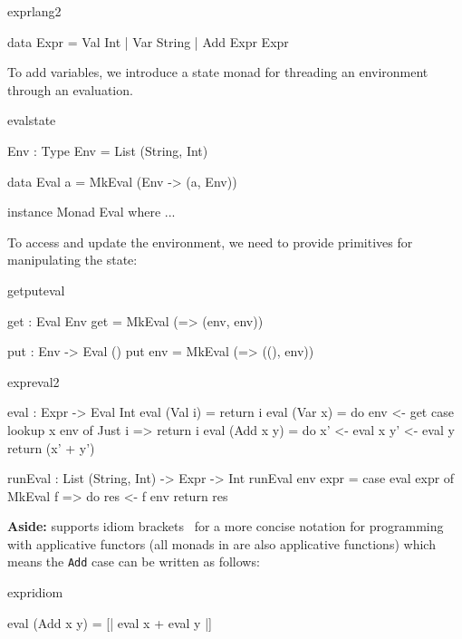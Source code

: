 \begin{SaveVerbatim}{exprlang2}

data Expr = Val Int
          | Var String
          | Add Expr Expr

\end{SaveVerbatim}

To add variables, we introduce a state monad for threading an environment
through an evaluation.

\begin{SaveVerbatim}{evalstate}

Env : Type
Env = List (String, Int)

data Eval a = MkEval (Env -> (a, Env))

instance Monad Eval where
    ...

\end{SaveVerbatim}

To access and update the environment, we need to provide primitives for
manipulating the state:

\begin{SaveVerbatim}{getputeval}

get : Eval Env
get = MkEval (\env => (env, env))
  
put : Env -> Eval ()
put env = MkEval (\x => ((), env))

\end{SaveVerbatim}

\begin{SaveVerbatim}{expreval2}

eval : Expr -> Eval Int
eval (Val i) = return i
eval (Var x) = do env <- get
                  case lookup x env of
                       Just i => return i
eval (Add x y) = do x' <- eval x 
                    y' <- eval y
                    return (x' + y')

runEval : List (String, Int) -> Expr -> Int
runEval env expr = case eval expr of
                        MkEval f => do res <- f env
                                       return res

\end{SaveVerbatim}

\noindent
\textbf{Aside:} \Idris{} supports idiom brackets~\cite{McBride2007} for a
more concise notation for programming with applicative functors (all monads
in \Idris{} are also applicative functions) which means the \texttt{Add}
case can be written as follows:

\begin{SaveVerbatim}{expridiom}

eval (Add x y) = [| eval x + eval y |]

\end{SaveVerbatim}

